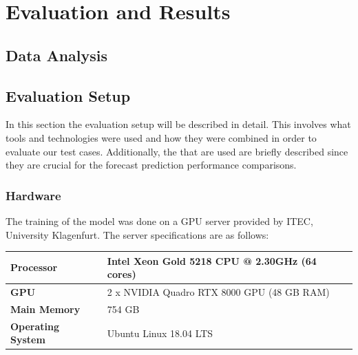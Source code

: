 \chapter{Evaluation and Results}
\label{ch:evaluation-and-results}

\section{Data Analysis}
\label{sec:data-analysis-evaluation}

\section{Evaluation Setup}
\label{sec:evaluation-setup}

  In this section the evaluation setup will be described in detail. 
  This involves what tools and technologies were used and how they were combined in order to evaluate our test cases. Additionally, the  that are used are briefly described since they are crucial for the forecast prediction performance comparisons.
  
  \subsection{Hardware}
  \label{sec:hardware}

    The training of the  model was done on a GPU server provided by ITEC, University Klagenfurt. The server specifications are as follows:

    \begin{center}
      \begin{tabular}{| l | l |}
        \hline
        \textbf{Processor}   &   Intel Xeon Gold 5218 CPU @ 2.30GHz (64 cores) \\ \hline
        \textbf{GPU}         &   2 x NVIDIA Quadro RTX 8000 GPU (48 GB RAM)    \\ \hline
        \textbf{Main Memory} &   754 GB                                        \\ \hline
        \textbf{Operating System} &  Ubuntu Linux 18.04 LTS                    \\ \hline

        \hline
      \end{tabular}
      \end{center}

